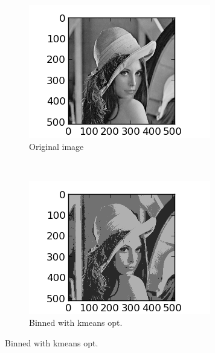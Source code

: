 \documentclass{article}
\begin{document}
    \begin{figure}
            \centering
            \begin{subfigure}[b]{0.3\textwidth}
                    \centering
                    \includegraphics[width=\textwidth]{original.png}
                    \caption{Original image}
                    \label{fig:original3}
            \end{subfigure}%
            ~ %
            \begin{subfigure}[b]{0.3\textwidth}
                    \centering
                    \includegraphics[width=\textwidth]{compressed_3.png}
                    \caption{Binned with kmeans opt.}

\end{subfigure}
\end{figure}
\end{document}
